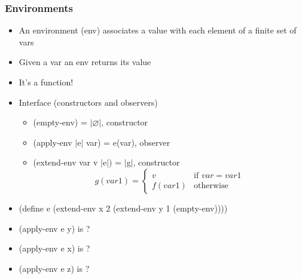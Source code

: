 \documentclass{beamer}
\newcommand{\quot}{\texttt{\textquotesingle{}}}
\begin{document}
\begin{frame}[fragile]
\frametitle{Environments}
\begin{scriptsize}
\begin{itemize}
\item<1-> An environment (env) associates a value with each element of a finite set of vars

\item<2-> Given a var an env returns its value

\item<2-> It's a function!

\item<3-> Interface (constructors and observers)
  \begin{itemize}
    \item (empty-env) = $|\varnothing|$, constructor
    \item (apply-env $|$e$|$ var) = e(var), observer
    \item (extend-env var v $|$e$|$) = $|$g$|$, constructor
    \begin{equation*}
      g(var1)=\begin{cases}
                v & \text{if \(var=var1\)} \\
                f(var1) & \text{otherwise}
              \end{cases}
    \end{equation*}
  \end{itemize}

\item<4-> (define e (extend-env  \quot{}x
				                  2
				                  (extend-env \quot{}y 1 (empty-env))))

\item<4-> (apply-env e \quot{}y) is ?

\item<4-> (apply-env e \quot{}x) is ?

\item<4-> (apply-env e \quot{}z) is ?


\end{itemize}
\end{scriptsize}
\end{frame}
\end{document}
